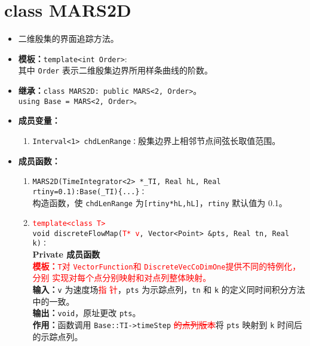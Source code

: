 \documentclass[a4paper,twoside]{ctexart}
\begin{document}
\section{class MARS2D}
\begin{itemize}
    \item 二维殷集的界面追踪方法。
    \item \textbf{模板：}\texttt{template<int Order>}:\\
    其中 \texttt{Order} 表示二维殷集边界所用样条曲线的阶数。
    \item \textbf{继承：}\texttt{class MARS2D: public MARS<2, Order>}。\\
    \texttt{using Base = MARS<2, Order>。}
    \item \textbf{成员变量：}
            \begin{enumerate}[(1)]
                \item \texttt{Interval<1> chdLenRange：}殷集边界上相邻节点间弦长取值范围。
            \end{enumerate}
    \item \textbf{成员函数：}
            \begin{enumerate}[(1)]
                \item \texttt{MARS2D(TimeIntegrator<2> *\_TI, Real hL, Real rtiny=0.1):Base(\_TI)\{...\}：}\\
                构造函数，使 \texttt{chdLenRange} 为\texttt{[rtiny*hL,hL]}，\texttt{rtiny} 默认值为 0.1。
                \item \textcolor{red}{\texttt{template<class T>}}\\\texttt{void discreteFlowMap(}\textcolor{red}{\texttt{T* v}}\texttt{, Vector<Point> \&pts, Real tn, Real k)：}\\
                  \textbf{Private 成员函数}\\
                  \textcolor{red}{\textbf{模板：}\texttt{T}对
                    \texttt{VectorFunction}和
                    \texttt{DiscreteVecCoDimOne}提供不同的特例化，分别
                    实现对每个点分别映射和对点列整体映射。}\\
                \textbf{输入：}\texttt{v} 为速度场\textcolor{red}{指
                  针}，\texttt{pts} 为示踪点列，\texttt{tn} 和 \texttt{k} 的定义同时间积分方法中的一致。\\
                \textbf{输出：}\texttt{void}，原址更改 \texttt{pts}。\\
                \textbf{作用：}函数调用 \texttt{Base::TI->timeStep} \textcolor{red}{\sout{的点列版本}}将 \texttt{pts} 映射到 \texttt{k} 时间后的示踪点列。

\end{enumerate}
\end{itemize}
\end{document}
